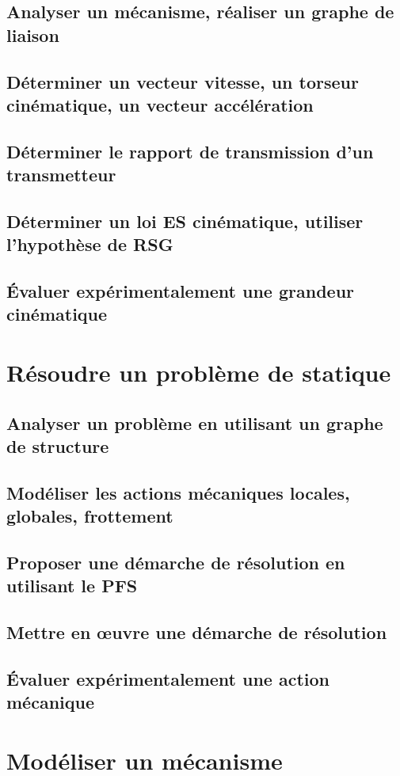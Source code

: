 \section{Analyser un mécanisme, réaliser un graphe de liaison} 
\section{Déterminer un vecteur vitesse, un torseur cinématique, un vecteur accélération} 
\section{Déterminer le rapport de transmission d'un transmetteur} 
\section{Déterminer un loi ES cinématique, utiliser l'hypothèse de RSG} 
\section{Évaluer expérimentalement une grandeur cinématique} 
\setchapterpreamble[u]{\margintoc} 
\chapter{Résoudre un problème de statique} 
\section{Analyser un problème en utilisant un graphe de structure} 
\section{Modéliser les actions mécaniques locales, globales, frottement} 
\section{Proposer une démarche de résolution en utilisant le PFS} 
\section{Mettre en œuvre une démarche de résolution} 
\section{Évaluer expérimentalement une action mécanique} 
\setchapterpreamble[u]{\margintoc} 
\chapter{Modéliser un mécanisme} 
